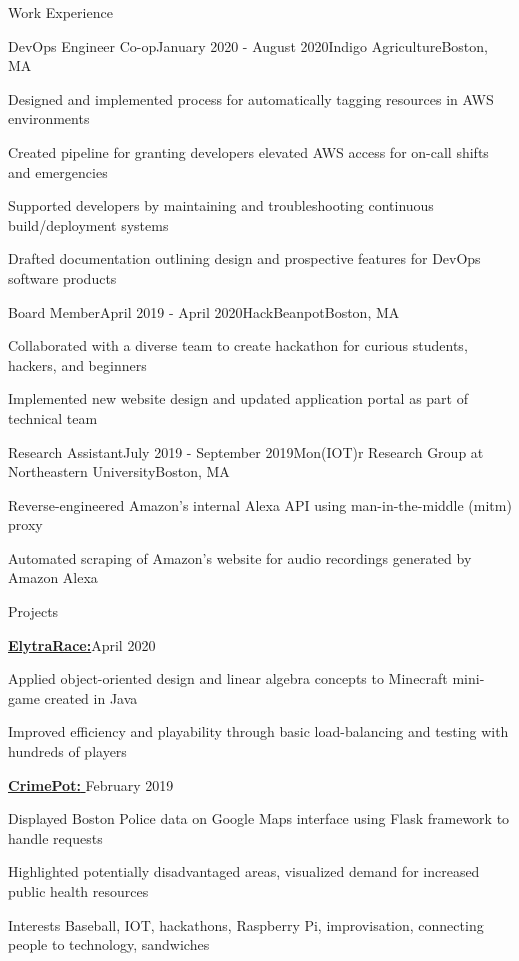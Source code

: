 \documentclass{resume}
\begin{document}
\begin{rSection}{Work Experience}

\begin{rSubsection}{DevOps Engineer Co-op}{January 2020 - August 2020}{Indigo Agriculture}{Boston, MA}
\item Designed and implemented process for automatically tagging resources in AWS environments
\item Created pipeline for granting developers elevated AWS access for on-call shifts and emergencies
\item Supported developers by maintaining and troubleshooting continuous build/deployment systems
\item Drafted documentation outlining design and prospective
 features for DevOps software products
\end{rSubsection}

\begin{rSubsection}{Board Member}{April 2019 - April 2020}{HackBeanpot}{Boston, MA}
\item Collaborated with a diverse team to create hackathon for curious students, hackers, and beginners
\item Implemented new website design and updated application portal as part of technical team
\end{rSubsection}

\begin{rSubsection}{Research Assistant}{July 2019 - September 2019}{Mon(IOT)r Research Group at Northeastern University}{Boston, MA}
\item Reverse-engineered Amazon's internal Alexa API using man-in-the-middle (mitm) proxy 
\item Automated scraping of Amazon's website for audio recordings generated by Amazon Alexa
\end{rSubsection}
\end{rSection}

\begin{rSection}{Projects}

\begin{rSubsection}{\href{https://www.github.com/kyleposluns/elytrarace}{{\bf ElytraRace:}}}{April 2020}{}{}
\item Applied object-oriented design and linear algebra concepts to Minecraft mini-game created in Java
\item Improved efficiency and playability through basic load-balancing and testing with hundreds of players
\end{rSubsection}

\begin{rSubsection}{\href{https://www.devpost.com/software/CrimePot}{{\bf CrimePot:} }}{February 2019}{}{}
\item Displayed Boston Police data on Google Maps interface using Flask framework to handle requests
\item Highlighted potentially disadvantaged areas, visualized demand for increased public health resources 
\end{rSubsection}

\end{rSection}

\begin{rSection}{Interests}\itemsep -5pt
Baseball, IOT, hackathons, Raspberry Pi, improvisation, connecting people to technology, sandwiches
\end{rSection}
\end{document}
